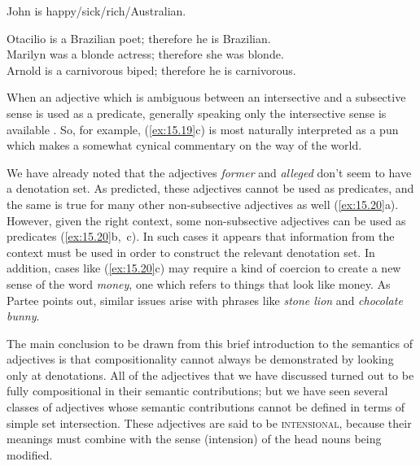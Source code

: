 \ea \label{ex:15.17}
John is happy/sick/rich/Australian.
\z

\ea \label{ex:15.18}
\ea \label{ex:15.} Otacilio is a Brazilian poet; therefore he is Brazilian.\\
\ex Marilyn was a blonde actress; therefore she was blonde.\\
\ex Arnold is a carnivorous biped; therefore he is carnivorous.
                       \z
\z


When an adjective which is ambiguous between an intersective and a subsective sense is used as a predicate, generally speaking only the intersective sense is available . So, for example, (\ref{ex:15.19}c) is most naturally interpreted as a pun which makes a somewhat cynical commentary on the way of the world.


\ea \label{ex:15.19}
                       \z
\z


We have already noted that the adjectives \textit{former} and \textit{alleged} don’t seem to have a denotation set. As predicted, these adjectives cannot be used as predicates, and the same is true for many other non-subsective adjectives as well (\ref{ex:15.20}a). However, given the right context, some non-subsective adjectives can be used as predicates (\ref{ex:15.20}b,~c). In such cases it appears that information from the context must be used in order to construct the relevant denotation set. In addition, cases like (\ref{ex:15.20}c) may require a kind of coercion to create a new sense of the word \textit{money}, one which refers to things that look like money. As Partee points out, similar issues arise with phrases like \textit{stone lion} and \textit{chocolate bunny}.


\ea \label{ex:15.20}
                       \z
\z


The main conclusion to be drawn from this brief introduction to the semantics of adjectives is that compositionality cannot always be demonstrated by looking only at denotations. All of the adjectives that we have discussed turned out to be fully compositional in their semantic contributions; but we have seen several classes of adjectives whose semantic contributions cannot be defined in terms of simple set intersection. These adjectives are said to be \textsc{intensional}, because their meanings must combine with the sense (intension) of the head nouns being modified.



